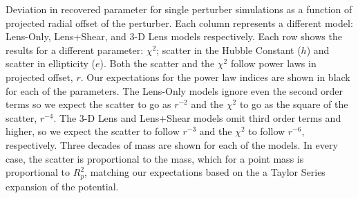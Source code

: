 \label{fig:toyr3} Deviation in recovered parameter for single perturber simulations as a function of projected radial offset of the perturber. Each column represents a different model: Lens-Only, Lens+Shear, and 3-D Lens models respectively. Each row shows the results for a different parameter: $\chi^2$; scatter in the Hubble Constant ($h$) and scatter in ellipticity ($e$). Both the scatter and the $\chi^2$ follow power laws in projected offset, $r$. Our expectations for the power law indices are shown in black for each of the parameters. The Lens-Only models ignore even the second order terms so we expect the scatter to go as $r^{-2}$ and the $\chi^2$ to go as the square of the scatter, $r^{-4}$. The 3-D Lens and Lens+Shear models omit third order terms and higher, so we expect the scatter to follow $r^{-3}$ and the $\chi^2$ to follow $r^{-6}$, respectively. Three decades of mass are shown for each of the models. In every case, the scatter is proportional to the mass, which for a point mass is proportional to $R_p^2$, matching our expectations based on the a Taylor Series expansion of the potential.